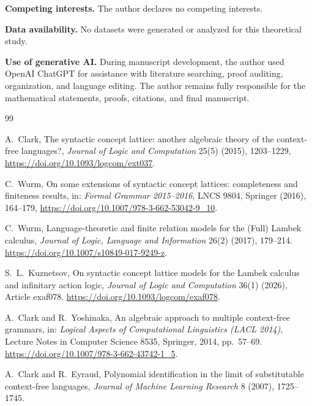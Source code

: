 \documentclass[10pt,a4paper]{article}
\theoremstyle{definition}
\theoremstyle{remark}
\begin{document}
\noindent\textbf{Competing interests.}
The author declares no competing interests.

\noindent\textbf{Data availability.}
No datasets were generated or analyzed for this theoretical study.

\noindent\textbf{Use of generative AI.}
During manuscript development, the author used OpenAI ChatGPT for assistance
with literature searching, proof auditing, organization, and language editing.
The author remains fully responsible for the mathematical statements, proofs,
citations, and final manuscript.

\small
\begin{thebibliography}{99}

A.~Clark,
\newblock The syntactic concept lattice: another algebraic theory of the context-free languages?,
\newblock \emph{Journal of Logic and Computation} 25(5) (2015), 1203--1229,
\newblock \url{https://doi.org/10.1093/logcom/ext037}.

C.~Wurm,
\newblock On some extensions of syntactic concept lattices: completeness and finiteness results,
\newblock in: \emph{Formal Grammar 2015--2016}, LNCS 9804, Springer (2016), 164--179,
\newblock \url{https://doi.org/10.1007/978-3-662-53042-9_10}.

C.~Wurm,
\newblock Language-theoretic and finite relation models for the (Full) Lambek calculus,
\newblock \emph{Journal of Logic, Language and Information} 26(2) (2017), 179--214.
\newblock \url{https://doi.org/10.1007/s10849-017-9249-z}.

S.~L.~Kuznetsov,
\newblock On syntactic concept lattice models for the Lambek calculus and infinitary action logic,
\newblock \emph{Journal of Logic and Computation} 36(1) (2026), Article exaf078.
\newblock \url{https://doi.org/10.1093/logcom/exaf078}.

A.~Clark and R.~Yoshinaka,
\newblock An algebraic approach to multiple context-free grammars,
\newblock in: \emph{Logical Aspects of Computational Linguistics (LACL 2014)},
Lecture Notes in Computer Science 8535, Springer, 2014, pp.~57--69.
\newblock \url{https://doi.org/10.1007/978-3-662-43742-1_5}.

A.~Clark and R.~Eyraud,
\newblock Polynomial identification in the limit of substitutable
context-free languages,
\newblock \emph{Journal of Machine Learning Research} 8 (2007), 1725--1745.


\end{thebibliography}
\end{document}
